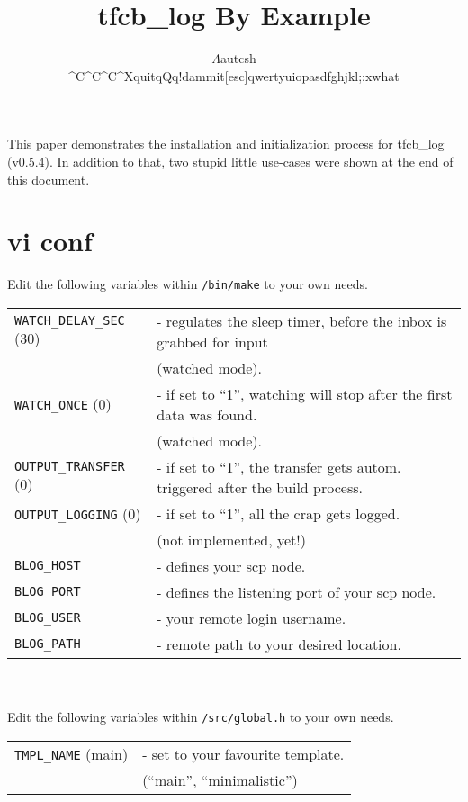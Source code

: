 %
\setlength{\topmargin}{-.5in}
\setlength{\textheight}{9in}
\setlength{\oddsidemargin}{.125in}
\setlength{\textwidth}{6.25in}

\title{tfcb\_log By Example}
\author{$\Lambda$autcsh \\
\^\-C\^\-C\^\-C\^\-XquitqQq!dammit[esc]qwertyuiopasdfghjkl;:xwhat}
\renewcommand{\today}{March 3, 2012}
\maketitle
This paper demonstrates the installation and initialization process for tfcb\_log (v0.5.4). In addition to that, two stupid little use-cases were shown at the end of this document. 
\section {vi conf}
Edit the following variables within \texttt{/bin/make} to your own needs.
{\quotation \begin{tabular}{ll}
\texttt{WATCH\_DELAY\_SEC} (30)&- regulates the sleep timer, before the inbox is grabbed for input\\ 
&(watched mode).\\
\texttt{WATCH\_ONCE} (0)&- if set to ``1'', watching will stop after the first data was found.\\ 
&(watched mode).\\
\texttt{OUTPUT\_TRANSFER} (0)&- if set to ``1'', the transfer gets autom. triggered after the build process.\\
\texttt{OUTPUT\_LOGGING} (0)&- if set to ``1'', all the crap gets logged.\\
&(not implemented, yet!)\\
\texttt{BLOG\_HOST}&- defines your scp node.\\
\texttt{BLOG\_PORT}&- defines the listening port of your scp node.\\
\texttt{BLOG\_USER}&- your remote login username.\\
\texttt{BLOG\_PATH}&- remote path to your desired location.
\end{tabular}}
\newline\\\\
Edit the following variables within \texttt{/src/global.h} to your own needs.
{\quotation \begin{tabular}{ll}
\texttt{TMPL\_NAME} (main)&- set to your favourite template.\\
&(``main'', ``minimalistic'')\\
\end{tabular}}
\newline\\
